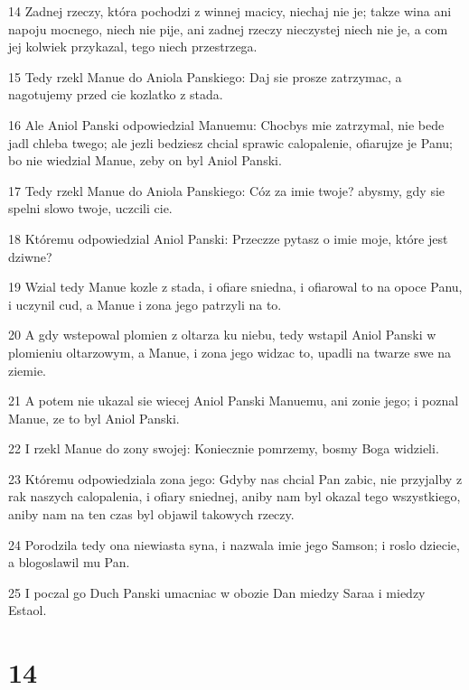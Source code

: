 \par 14 Zadnej rzeczy, która pochodzi z winnej macicy, niechaj nie je; takze wina ani napoju mocnego, niech nie pije, ani zadnej rzeczy nieczystej niech nie je, a com jej kolwiek przykazal, tego niech przestrzega.
\par 15 Tedy rzekl Manue do Aniola Panskiego: Daj sie prosze zatrzymac, a nagotujemy przed cie kozlatko z stada.
\par 16 Ale Aniol Panski odpowiedzial Manuemu: Chocbys mie zatrzymal, nie bede jadl chleba twego; ale jezli bedziesz chcial sprawic calopalenie, ofiarujze je Panu; bo nie wiedzial Manue, zeby on byl Aniol Panski.
\par 17 Tedy rzekl Manue do Aniola Panskiego: Cóz za imie twoje? abysmy, gdy sie spelni slowo twoje, uczcili cie.
\par 18 Któremu odpowiedzial Aniol Panski: Przeczze pytasz o imie moje, które jest dziwne?
\par 19 Wzial tedy Manue kozle z stada, i ofiare sniedna, i ofiarowal to na opoce Panu, i uczynil cud, a Manue i zona jego patrzyli na to.
\par 20 A gdy wstepowal plomien z oltarza ku niebu, tedy wstapil Aniol Panski w plomieniu oltarzowym, a Manue, i zona jego widzac to, upadli na twarze swe na ziemie.
\par 21 A potem nie ukazal sie wiecej Aniol Panski Manuemu, ani zonie jego; i poznal Manue, ze to byl Aniol Panski.
\par 22 I rzekl Manue do zony swojej: Koniecznie pomrzemy, bosmy Boga widzieli.
\par 23 Któremu odpowiedziala zona jego: Gdyby nas chcial Pan zabic, nie przyjalby z rak naszych calopalenia, i ofiary sniednej, aniby nam byl okazal tego wszystkiego, aniby nam na ten czas byl objawil takowych rzeczy.
\par 24 Porodzila tedy ona niewiasta syna, i nazwala imie jego Samson; i roslo dziecie, a blogoslawil mu Pan.
\par 25 I poczal go Duch Panski umacniac w obozie Dan miedzy Saraa i miedzy Estaol.

\chapter{14}

